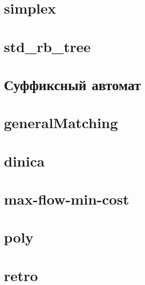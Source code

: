 \documentclass[portrait,twocolumn,letterpaper]{article}
\begin{document}
\section{simplex}


\section{std\_rb\_tree}

 
\section{Суффиксный автомат}


\section{generalMatching}


\section{dinica}


%

\section{max-flow-min-cost}


\section{poly}


%

\section{retro}



\end{document}
